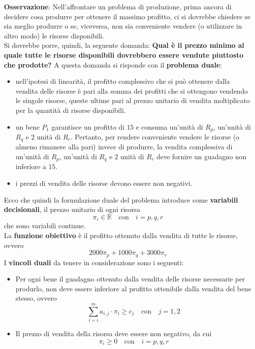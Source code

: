 \documentclass[a4paper]{extarticle}
\begin{document}
\vspace{1em}
\noindent
\textbf{Osservazione}: Nell'affrontare un problema di produzione, prima ancora di decidere cosa produrre per ottenere il massimo profitto, ci si dovrebbe chiedere se sia meglio produrre o se, viceversa, non sia conveniente vendere (o utilizzare in altro modo) le risorse disponibili.\\
Si dovrebbe porre, quindi, la seguente domanda:
\textbf{Qual è il prezzo minimo al quale tutte le risorse disponibili dovrebbero essere vendute piuttosto che prodotte?}
A questa domanda si risponde con il \textbf{problema duale}:
\begin{itemize}
    \item nell'ipotesi di linearità, il profitto complessivo che si può ottenere dalla vendita delle risorse è pari alla somma dei profitti che si ottengono vendendo le singole risorse, queste ultime pari al prezzo unitario di vendita moltiplicato per la quantità di risorse disponibili.
    \item un bene $P_1$ garantisce un profitto di $15$ e consuma un'unità di $R_p$, un'unità di $R_q$ e $2$ unità di $R_r$. Pertanto, per rendere conveniente vendere le risorse (o almeno rimanere alla pari) invece di produrre, la vendita complessiva di un'unità di $R_p$, un'unità di $R_q$ e $2$ unità di $R_r$ deve fornire un guadagno non inferiore a $15$.
    \item i prezzi di vendita delle risorse devono essere non negativi.
\end{itemize}
Ecco che quindi la formulazione duale del problema introduce come \textbf{variabili decisionali}, il prezzo unitario di ogni risorsa
\[\pi_i \in \mathbb{R} \hspace{1em} \text{con} \hspace{1em} i=p,q,r\]
che sono variabili continue.\\
La \textbf{funzione obiettivo} è il profitto ottenuto dalla vendita di tutte le risorse, ovvero
\[2000\pi_p+1000\pi_q+3000\pi_r\]
I \textbf{vincoli duali} da tenere in considerazione sono i seguenti:
\begin{itemize}
    \item Per ogni bene il guadagno ottenuto dalla vendita delle risorse necessarie per produrlo, non deve essere inferiore al profitto ottenibile dalla vendita del bene stesso, ovvero
    \[\sum_{i=i}^{m} a_{i,j} \cdot \pi_i \geq c_j \hspace{1em} \text{con} \hspace{1em} j=1,2\]
    \item Il prezzo di vendita della risorsa deve essere non negativo, da cui
    \[\pi_i \geq 0 \hspace{1em} \text{con} \hspace{1em} i=p,q,r\]
\end{itemize}
\end{document}

